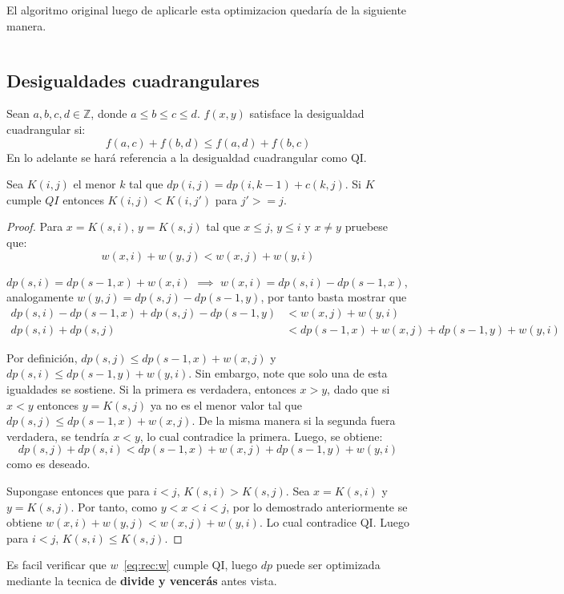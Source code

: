 \documentclass[spanish]{llncs}
\newcommand*{\Z}{\mathds{Z}}
\begin{document}
El algoritmo original luego de aplicarle esta optimizacion quedaría de la siguiente
manera.

\inputminted{python}{optimized.py}

\subsection{Desigualdades cuadrangulares}

\begin{definition}
	\label{def:qi}
	Sean $a,b,c,d \in \Z$, donde $a \le b \le c \le d$. $f(x,y)$ satisface
	la desigualdad cuadrangular si:
	\begin{equation*}
		f(a,c) + f(b,d) \le f(a,d) + f(b,c)
	\end{equation*}
	En lo adelante se hará referencia a la desigualdad cuadrangular como QI.
\end{definition}

\begin{theorem}
	Sea $K(i,j)$ el menor $k$ tal que $dp(i,j) = dp(i,k-1) + c(k,j)$.
	Si $K$ cumple $QI$ entonces $K(i,j) < K(i,j')$ para $j' >= j$.
\end{theorem}

\begin{proof}
	Para $x=K(s,i)$, $y=K(s,j)$ tal que $x \le j$, $y \le i$ y $x \neq y$
	pruebese que:
	\begin{equation}
		w(x,i) + w(y,j) < w(x,j) + w(y,i)
	\end{equation}

	$dp(s,i) = dp(s-1,x) + w(x,i)$ $\implies$ $w(x,i) = dp(s,i) - dp(s-1,x)$,
	analogamente $w(y,j) = dp(s,j) - dp(s-1,y)$, por tanto basta mostrar que						
	\begin{equation}
		\begin{split}
			dp(s,i) - dp(s-1,x) + dp(s,j) - dp(s-1,y) &< w(x,j) + w(y,i) \\
			dp(s,i) + dp(s,j) &< dp(s-1,x) + w(x,j) + dp(s-1,y) + w(y,i)
		\end{split}
	\end{equation}
	
	Por definición, $dp(s,j) \le dp(s-1,x) + w(x,j)$ y
	$dp(s,i) \le dp(s-1,y) + w(y,i)$. Sin embargo, note que solo
	una de esta igualdades se sostiene. Si la primera es verdadera,
	entonces $x>y$, dado que si $x < y$ entonces $y=K(s,j)$ ya no es el menor
	valor tal que $dp(s,j) \le dp(s-1,x) + w(x,j)$. De la misma manera si la
	segunda fuera verdadera, se tendría $x<y$, lo cual contradice la primera.
	Luego, se obtiene:
	\begin{equation*}
		dp(s,j)+dp(s,i)<dp(s-1,x)+w(x,j)+dp(s-1,y)+w(y,i)
	\end{equation*}
	como es deseado.

	Supongase entonces que para $i<j$, $K(s,i)>K(s,j)$. Sea $x=K(s,i)$ y 
	$y=K(s,j)$. Por tanto, como $y < x < i < j$, por lo demostrado anteriormente
	se obtiene $w(x,i) + w(y,j) < w(x,j) + w(y,i)$. Lo cual contradice QI. Luego
	para $i<j$, $K(s,i) \le K(s,j)$.
\end{proof}

Es facil verificar que $w$~\eqref{eq:rec:w} cumple QI, luego $dp$ puede ser
optimizada mediante la tecnica de \textbf{divide y vencerás} antes vista.
\end{document}
